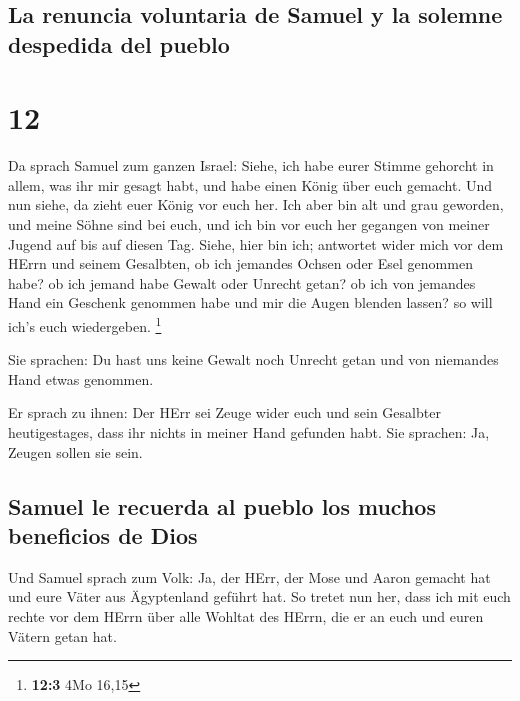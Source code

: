 \hypertarget{la-renuncia-voluntaria-de-samuel-y-la-solemne-despedida-del-pueblo}{%
\subsection{La renuncia voluntaria de Samuel y la solemne despedida del
pueblo}\label{la-renuncia-voluntaria-de-samuel-y-la-solemne-despedida-del-pueblo}}

\hypertarget{section-11}{%
\section{12}\label{section-11}}

 Da sprach Samuel zum ganzen Israel: Siehe, ich habe eurer
Stimme gehorcht in allem, was ihr mir gesagt habt, und habe einen König
über euch gemacht.  Und nun siehe, da zieht euer König vor
euch her. Ich aber bin alt und grau geworden, und meine Söhne sind bei
euch, und ich bin vor euch her gegangen von meiner Jugend auf bis auf
diesen Tag.  Siehe, hier bin ich; antwortet wider mich vor
dem HErrn und seinem Gesalbten, ob ich jemandes Ochsen oder Esel
genommen habe? ob ich jemand habe Gewalt oder Unrecht getan? ob ich von
jemandes Hand ein Geschenk genommen habe und mir die Augen blenden
lassen? so will ich's euch wiedergeben. \footnote{\textbf{12:3} 4Mo
  16,15}

 Sie sprachen: Du hast uns keine Gewalt noch Unrecht getan
und von niemandes Hand etwas genommen.

 Er sprach zu ihnen: Der HErr sei Zeuge wider euch und
sein Gesalbter heutigestages, dass ihr nichts in meiner Hand gefunden
habt. Sie sprachen: Ja, Zeugen sollen sie sein.

\hypertarget{samuel-le-recuerda-al-pueblo-los-muchos-beneficios-de-dios}{%
\subsection{Samuel le recuerda al pueblo los muchos beneficios de
Dios}\label{samuel-le-recuerda-al-pueblo-los-muchos-beneficios-de-dios}}

 Und Samuel sprach zum Volk: Ja, der HErr, der Mose und
Aaron gemacht hat und eure Väter aus Ägyptenland geführt hat.
 So tretet nun her, dass ich mit euch rechte vor dem HErrn
über alle Wohltat des HErrn, die er an euch und euren Vätern getan hat.

